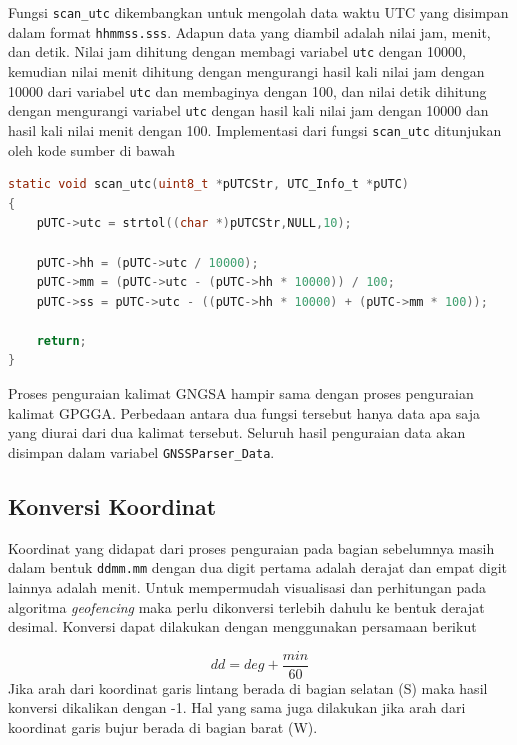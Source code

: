 Fungsi \texttt{scan\_utc} dikembangkan untuk mengolah data waktu UTC yang disimpan dalam format \texttt{hhmmss.sss}. Adapun data yang diambil adalah nilai jam, menit, dan detik. Nilai jam dihitung dengan membagi variabel \texttt{utc} dengan 10000, kemudian nilai menit dihitung dengan mengurangi hasil kali nilai jam dengan 10000 dari variabel \texttt{utc} dan membaginya dengan 100, dan nilai detik dihitung dengan mengurangi variabel \texttt{utc} dengan hasil kali nilai jam dengan 10000 dan hasil kali nilai menit dengan 100. Implementasi dari fungsi \texttt{scan\_utc} ditunjukan oleh kode sumber di bawah
\begin{lstlisting}[language=c]
static void scan_utc(uint8_t *pUTCStr, UTC_Info_t *pUTC)
{
	pUTC->utc = strtol((char *)pUTCStr,NULL,10);
	
	pUTC->hh = (pUTC->utc / 10000);
	pUTC->mm = (pUTC->utc - (pUTC->hh * 10000)) / 100;
	pUTC->ss = pUTC->utc - ((pUTC->hh * 10000) + (pUTC->mm * 100));
	
	return;
}
\end{lstlisting}

Proses penguraian kalimat GNGSA hampir sama dengan proses penguraian kalimat GPGGA. Perbedaan antara dua fungsi tersebut hanya data apa saja yang diurai dari dua kalimat tersebut. Seluruh hasil penguraian data akan disimpan dalam variabel \texttt{GNSSParser\_Data}.

\subsection{Konversi Koordinat}
Koordinat yang didapat dari proses penguraian pada bagian sebelumnya masih dalam bentuk \texttt{ddmm.mm} dengan dua digit pertama adalah derajat dan empat digit lainnya adalah menit. Untuk mempermudah visualisasi dan perhitungan pada algoritma \textit{geofencing} maka perlu dikonversi terlebih dahulu ke bentuk derajat desimal. Konversi dapat dilakukan dengan menggunakan persamaan berikut

\begin{equation}
	dd = deg + \frac{min}{60} 
\end{equation}
Jika arah dari koordinat garis lintang berada di bagian selatan (S) maka hasil konversi dikalikan dengan -1. Hal yang sama juga dilakukan jika arah dari koordinat garis bujur berada di bagian barat (W).

